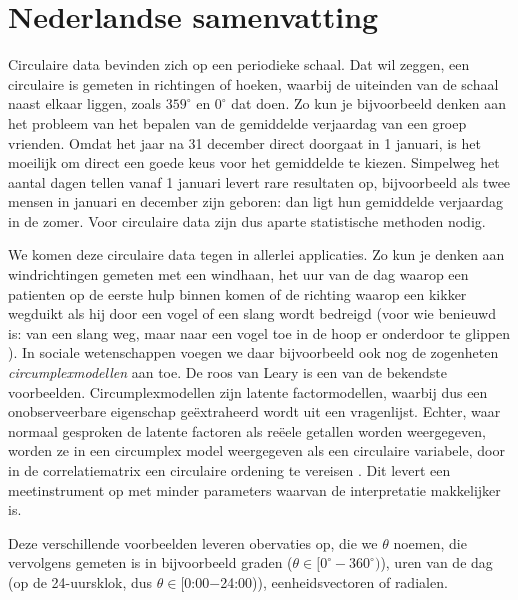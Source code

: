 \documentclass[12pt, a4paper]{book}\usepackage[]{graphicx}\usepackage[]{color}
\begin{document}
\label{circbays}


\backmatter

\chapter{Nederlandse samenvatting}

Circulaire data bevinden zich op een periodieke schaal. Dat wil zeggen, een circulaire is gemeten in richtingen of hoeken, waarbij de uiteinden van de schaal naast elkaar liggen, zoals $359^\circ$ en $0^\circ$ dat doen. Zo kun je bijvoorbeeld denken aan het probleem van het bepalen van de gemiddelde verjaardag van een groep vrienden. Omdat het jaar na 31 december direct doorgaat in 1 januari, is het moeilijk om direct een goede keus voor het gemiddelde te kiezen. Simpelweg het aantal dagen tellen vanaf 1 januari levert rare resultaten op, bijvoorbeeld als twee mensen in januari en december zijn geboren: dan ligt hun gemiddelde verjaardag in de zomer. Voor circulaire data zijn dus aparte statistische methoden nodig.

We komen deze circulaire data tegen in allerlei applicaties. Zo kun je denken aan windrichtingen gemeten met een windhaan, het uur van de dag waarop een patienten op de eerste hulp binnen komen of de richting waarop een kikker wegduikt als hij door een vogel of een slang wordt bedreigd (voor wie benieuwd is: van een slang weg, maar naar een vogel toe in de hoop er onderdoor te glippen \citep{bulbert2015danger}). In sociale wetenschappen voegen we daar bijvoorbeeld ook nog de zogenheten \textit{circumplexmodellen} aan toe. De roos van Leary \citep{Leary1957} is een van de bekendste voorbeelden. Circumplexmodellen zijn latente factormodellen, waarbij dus een onobserveerbare eigenschap ge\"extraheerd wordt uit een vragenlijst. Echter, waar normaal gesproken de latente factoren als re\"eele getallen worden weergegeven, worden ze in een circumplex model weergegeven als een circulaire variabele, door in de correlatiematrix een circulaire ordening te vereisen \citep{browne1992circumplex}. Dit levert een meetinstrument op met minder parameters waarvan de interpretatie makkelijker is.

Deze verschillende voorbeelden leveren obervaties op, die we $\theta$ noemen, die vervolgens gemeten is in bijvoorbeeld graden ($\theta \in [0^\circ - 360^\circ)$), uren van de dag (op de 24-uursklok, dus $\theta \in [$0:00$ - $24:00)), eenheidsvectoren of radialen.
\end{document}
